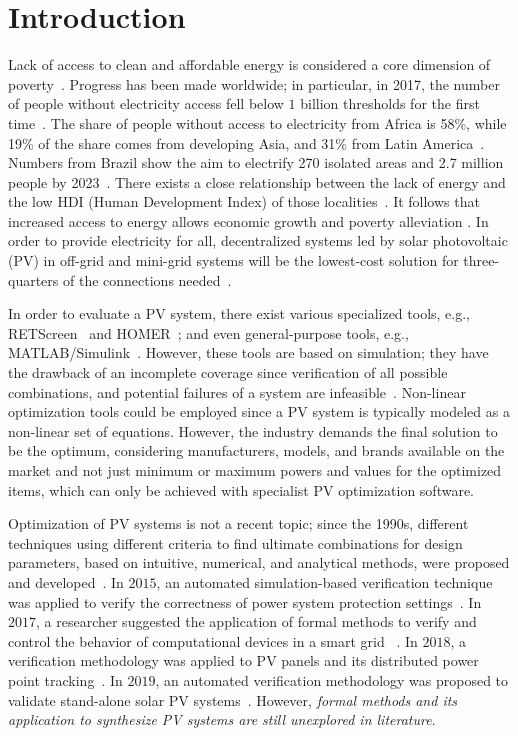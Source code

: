 \documentclass[runningheads]{llncs}
\begin{document}
\section{Introduction}
Lack of access to clean and affordable energy is considered a core dimension of poverty~\cite{Hussein2012}. Progress has been made worldwide; in particular, in 2017, the number of people without electricity access fell below $1$ billion thresholds for the first time~\cite{IEAweo2018}. The share of people without access to electricity from Africa is 58\%, while 19\% of the share comes from developing Asia, and 31\% from Latin America~\cite{IEAweo2018}. Numbers from Brazil show the aim to electrify 270 isolated areas and 2.7 million people by 2023~\cite{EPE2018}. 
There exists a close relationship between the lack of energy and the low HDI (Human Development Index) of those localities~\cite{Coelho}. It follows that increased access to energy allows economic growth and poverty alleviation \cite{Karekesi}. In order to provide electricity for all, decentralized systems led by solar photovoltaic (PV) in off-grid and mini-grid systems will be the lowest-cost solution for three-quarters of the connections needed~\cite{Hussein2012}. 

In order to evaluate a PV system, there exist various specialized tools, e.g., RETScreen~\cite{Pradhan} and HOMER~\cite{Swarnkar}; and even general-purpose tools, e.g., MATLAB/Simulink~\cite{Gow1999}. However, these tools are based on simulation; they have the drawback of an incomplete coverage since verification of all possible combinations, and potential failures of a system are infeasible~\cite{ClarkeHV18}. Non-linear optimization tools could be employed since a PV system is typically modeled as a non-linear set of equations. However, the industry demands the final solution to be the optimum, considering manufacturers, models, and brands available on the market and not just minimum or maximum powers and values for the optimized items, which can only be achieved with specialist PV optimization software.

Optimization of PV systems is not a recent topic; since the 1990s, different techniques using different criteria to find ultimate combinations for design parameters, based on intuitive, numerical, and analytical methods, were proposed and developed~\cite{Alsadi2018}. In $2015$, an automated simulation-based verification technique was applied to verify the correctness of power system protection settings~\cite{Sengupta2015}. In $2017$, a researcher suggested the application of formal methods to verify and control the behavior of computational devices in a smart grid ~\cite{Abate2017}. In $2018$, a verification methodology was applied to PV panels and its distributed power point tracking~\cite{Driouich2018}. In $2019$, an automated verification methodology was proposed to validate stand-alone solar PV systems~\cite{TrindadeCordeiro19}. However, \textit{formal methods and its application to synthesize PV systems are still unexplored in literature}.
\end{document}
